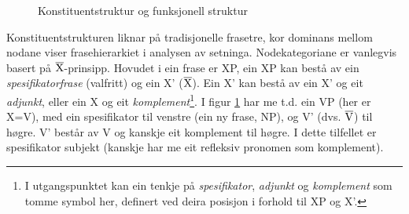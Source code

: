 \documentclass[11pt,a4paper,oneside,draft]{book}
\newcommand{\xbar}{$\rm\overline{X}$}
\newcommand{\proj}[2]{\begin{tabular}{c}\footnotesize{#1}\\\normalsize{#2}\end{tabular}}
\newcommand{\ua}{\ensuremath{\uparrow}}
\newcommand{\da}{\ensuremath{\downarrow}}
\begin{document}
 \begin{figure}[htp]
    \centering

    \caption{Konstituentstruktur og funksjonell struktur}
   \label{fig:f-og-c-struktur}
 \end{figure}

 Konstituentstrukturen liknar på tradisjonelle frasetre, kor dominans
 mellom nodane viser frasehierarkiet i analysen av
 setninga. Nodekategoriane er vanlegvis basert på
 \xbar-prinsipp. Hovudet i ein frase er XP, ein XP kan bestå av ein
 \emph{spesifikatorfrase} (valfritt) og ein X' (\xbar). Ein X' kan bestå av
 ein X' og eit \emph{adjunkt}, eller ein X og eit \emph{komplement}\footnote{I utgangspunktet kan ein tenkje på \emph{spesifikator}, \emph{adjunkt}
        og \emph{komplement} som tomme symbol her, definert ved deira
        posisjon i forhold til XP og X'. }. I
 figur \ref{fig:f-og-c-struktur} har me t.d. ein VP (her er X=V), med
 ein spesifikator til venstre (ein ny frase, NP), og V'
 (dvs. $\rm\overline{V}$) til høgre. V' består av V og kanskje eit
 komplement til høgre. I dette tilfellet er spesifikator subjekt
 (kanskje har me eit refleksiv pronomen som komplement).
\end{document}
